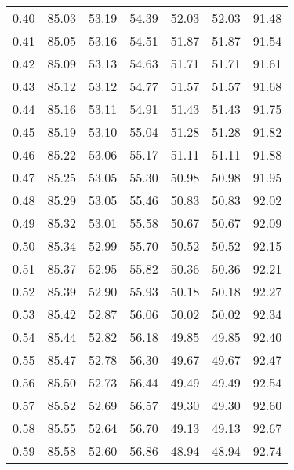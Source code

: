 \begin{tabular}{|c|c|c|c|c|c|c|}
      0.40 &     85.03 &     53.19 &      54.39 &   52.03 &      52.03 &         91.48 \\
      0.41 &     85.05 &     53.16 &      54.51 &   51.87 &      51.87 &         91.54 \\
      0.42 &     85.09 &     53.13 &      54.63 &   51.71 &      51.71 &         91.61 \\
      0.43 &     85.12 &     53.12 &      54.77 &   51.57 &      51.57 &         91.68 \\
      0.44 &     85.16 &     53.11 &      54.91 &   51.43 &      51.43 &         91.75 \\
      0.45 &     85.19 &     53.10 &      55.04 &   51.28 &      51.28 &         91.82 \\
      0.46 &     85.22 &     53.06 &      55.17 &   51.11 &      51.11 &         91.88 \\
      0.47 &     85.25 &     53.05 &      55.30 &   50.98 &      50.98 &         91.95 \\
      0.48 &     85.29 &     53.05 &      55.46 &   50.83 &      50.83 &         92.02 \\
      0.49 &     85.32 &     53.01 &      55.58 &   50.67 &      50.67 &         92.09 \\
      0.50 &     85.34 &     52.99 &      55.70 &   50.52 &      50.52 &         92.15 \\
      0.51 &     85.37 &     52.95 &      55.82 &   50.36 &      50.36 &         92.21 \\
      0.52 &     85.39 &     52.90 &      55.93 &   50.18 &      50.18 &         92.27 \\
      0.53 &     85.42 &     52.87 &      56.06 &   50.02 &      50.02 &         92.34 \\
      0.54 &     85.44 &     52.82 &      56.18 &   49.85 &      49.85 &         92.40 \\
      0.55 &     85.47 &     52.78 &      56.30 &   49.67 &      49.67 &         92.47 \\
      0.56 &     85.50 &     52.73 &      56.44 &   49.49 &      49.49 &         92.54 \\
      0.57 &     85.52 &     52.69 &      56.57 &   49.30 &      49.30 &         92.60 \\
      0.58 &     85.55 &     52.64 &      56.70 &   49.13 &      49.13 &         92.67 \\
      0.59 &     85.58 &     52.60 &      56.86 &   48.94 &      48.94 &         92.74 \\

\end{tabular}

